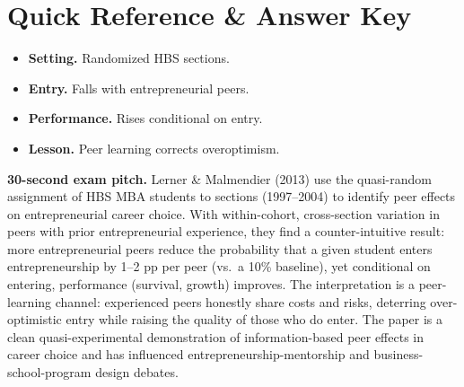 \documentclass[11pt]{article}
\begin{document}
\section*{Quick Reference \& Answer Key}
\begin{answerbox}
\begin{itemize}
\item \textbf{Setting.} Randomized HBS sections.
\item \textbf{Entry.} Falls with entrepreneurial peers.
\item \textbf{Performance.} Rises conditional on entry.
\item \textbf{Lesson.} Peer learning corrects overoptimism.
\end{itemize}
\end{answerbox}

\begin{keybox}
\textbf{30-second exam pitch.} Lerner \& Malmendier (2013) use the quasi-random assignment of HBS MBA students to sections (1997--2004) to identify peer effects on entrepreneurial career choice. With within-cohort, cross-section variation in peers with prior entrepreneurial experience, they find a counter-intuitive result: more entrepreneurial peers reduce the probability that a given student enters entrepreneurship by 1--2 pp per peer (vs.\ a 10\% baseline), yet conditional on entering, performance (survival, growth) improves. The interpretation is a peer-learning channel: experienced peers honestly share costs and risks, deterring over-optimistic entry while raising the quality of those who do enter. The paper is a clean quasi-experimental demonstration of information-based peer effects in career choice and has influenced entrepreneurship-mentorship and business-school-program design debates.
\end{keybox}
\end{document}
